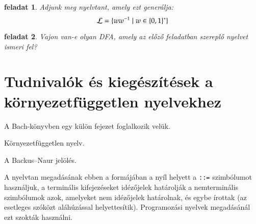 \documentclass[a4paper]{article}
\newtheorem{feladat}{feladat}[section]
\begin{document}
\begin{feladat}
Adjunk meg nyelvtant, amely ezt generálja:
\[{\cal L}=\{ww^{-1} \mid w\in \{0,1\}^*\}\]
\end{feladat}

\begin{feladat}
Vajon van-e olyan DFA, amely az előző feladatban szereplő nyelvet ismeri fel? 
\end{feladat}

\section{Tudnivalók és kiegészítések a környezetfüggetlen nyelvekhez}

A Bach-könyvben egy külön fejezet foglalkozik velük.

Környezetfüggetlen nyelv.

A Backus--Naur jelölés.

A nyelvtan megadásának ebben a formájában a nyíl helyett a \verb|::=|
szimbólumot használjuk, a terminális kifejezéseket idézőjelek határolják a
nemterminális szimbólumok azok, amelyeket nem idézőjelek határolnak, és egybe
írottak (az esetleges szóközt aláhúzással helyettesítik). Programozási
nyelvek megadásánál ezt szokták használni.
\end{document}

